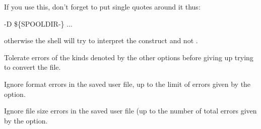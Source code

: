 If you use this, don't forget to put single quotes around it thus:

\begin{expara}

\XbBtuconvName{} -D {\textquotesingle}\$\{SPOOLDIR-\spooldirname\}{\textquotesingle} ...

\end{expara}

otherwise the shell will try to interpret the \exampletext{\$} construct and not \PrXbBtuconv.


Tolerate  errors of the kinds denoted by the other options before giving up trying to convert the file.


Ignore format errors in the saved user file, up to the limit of errors given by the  option.


Ignore file size errors in the saved user file (up to the number of total errors given by the 
option.


